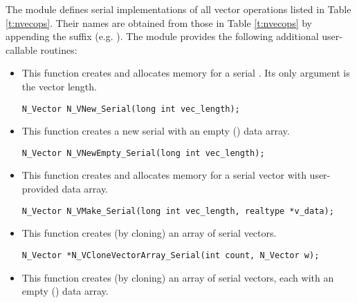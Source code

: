 The {\nvecs} module defines serial implementations of all vector operations listed 
in Table \ref{t:nvecops}. Their names are obtained from those in Table \ref{t:nvecops}
by appending the suffix  (e.g. ).
The module {\nvecs} provides the following additional user-callable routines:
\begin{itemize}


\item {}

  This function creates and allocates memory for a serial .
  Its only argument is the vector length.

  

  \verb|N_Vector N_VNew_Serial(long int vec_length);|


\item {}

  This function creates a new serial  with an empty () data array.

  

  \verb|N_Vector N_VNewEmpty_Serial(long int vec_length);|


\item {}

 This function creates and allocates memory for a serial vector
 with user-provided data array.

 

 \verb|N_Vector N_VMake_Serial(long int vec_length, realtype *v_data);|


\item {}

 This function creates (by cloning) an array of  serial vectors.

 

 \verb|N_Vector *N_VCloneVectorArray_Serial(int count, N_Vector w);|


\item {}

 This function creates (by cloning) an array of  serial vectors, each with an
 empty () data array.


\end{itemize}
